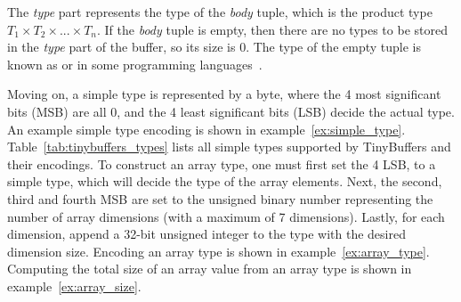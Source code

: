 The \emph{type} part represents the type of the \emph{body} tuple, which is the product type $T_1 \times T_2 \times ... \times T_n$. If the \emph{body} tuple is empty, then there are no types to be stored in the \emph{type} part of the buffer, so its size is 0. The type of the empty tuple is known as  or  in some programming languages~\cite{Pierce2002}.

Moving on, a simple type is represented by a byte, where the 4 most significant bits (MSB) are all 0, and the 4 least significant bits (LSB) decide the actual type. An example simple type encoding is shown in example~\ref{ex:simple_type}. Table~\ref{tab:tinybuffers_types} lists all simple types supported by TinyBuffers and their encodings.
To construct an array type, one must first set the 4 LSB, to a simple type, which will decide the type of the array elements. Next, the second, third and fourth MSB are set to the unsigned binary number representing the number of array dimensions (with a maximum of 7 dimensions). Lastly, for each dimension, append a 32-bit unsigned integer to the type with the desired dimension size. Encoding an array type is shown in example~\ref{ex:array_type}. Computing the total size of an array value from an array type is shown in example~\ref{ex:array_size}.

